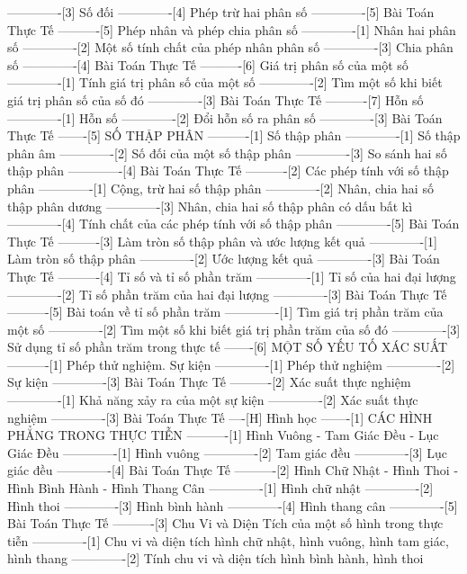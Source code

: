 -------------[3] Số đối
-------------[4] Phép trừ hai phân số
-------------[5] Bài Toán Thực Tế
----------[5] Phép nhân và phép chia phân số
-------------[1] Nhân hai phân số
-------------[2] Một số tính chất của phép nhân phân số
-------------[3] Chia phân số
-------------[4] Bài Toán Thực Tế
----------[6] Giá trị phân số của một số
-------------[1] Tính giá trị phân số của một số
-------------[2] Tìm một số khi biết giá trị phân số của số đó
-------------[3] Bài Toán Thực Tế
----------[7] Hỗn số
-------------[1] Hỗn số
-------------[2] Đổi hỗn số ra phân số
-------------[3] Bài Toán Thực Tế
-------[5] SỐ THẬP PHÂN
----------[1] Số thập phân
-------------[1] Số thập phân âm
-------------[2] Số đối của một số thập phân
-------------[3] So sánh hai số thập phân
-------------[4] Bài Toán Thực Tế
----------[2] Các phép tính với số thập phân
-------------[1] Cộng, trừ hai số thập phân
-------------[2] Nhân, chia hai số thập phân dương
-------------[3] Nhân, chia hai số thập phân có dấu bất kì
-------------[4] Tính chất của các phép tính với số thập phân
-------------[5] Bài Toán Thực Tế
----------[3] Làm tròn số thập phân và ước lượng kết quả
-------------[1] Làm tròn số thập phân
-------------[2] Ước lượng kết quả
-------------[3] Bài Toán Thực Tế
----------[4] Tỉ số và tỉ số phần trăm
-------------[1] Tỉ số của hai đại lượng
-------------[2] Tỉ số phần trăm của hai đại lượng
-------------[3] Bài Toán Thực Tế
----------[5] Bài toán về tỉ số phần trăm
-------------[1] Tìm giá trị phần trăm của một số
-------------[2] Tìm một số khi biết giá trị phần trăm của số đó
-------------[3] Sử dụng tỉ số phần trăm trong thực tế
-------[6] MỘT SỐ YẾU TỐ XÁC SUẤT
----------[1] Phép thử nghiệm. Sự kiện
-------------[1] Phép thử nghiệm
-------------[2] Sự kiện
-------------[3] Bài Toán Thực Tế
----------[2] Xác suất thực nghiệm
-------------[1] Khả năng xảy ra của một sự kiện
-------------[2] Xác suất thực nghiệm
-------------[3] Bài Toán Thực Tế
----[H] Hình học
-------[1] CÁC HÌNH PHẲNG TRONG THỰC TIỄN
----------[1] Hình Vuông - Tam Giác Đều - Lục Giác Đều
-------------[1] Hình vuông
-------------[2] Tam giác đều
-------------[3] Lục giác đều
-------------[4] Bài Toán Thực Tế
----------[2] Hình Chữ Nhật - Hình Thoi - Hình Bình Hành - Hình Thang Cân
-------------[1] Hình chữ nhật
-------------[2] Hình thoi
-------------[3] Hình bình hành
-------------[4] Hình thang cân
-------------[5] Bài Toán Thực Tế
----------[3] Chu Vi và Diện Tích của một số hình trong thực tiễn
-------------[1] Chu vi và diện tích hình chữ nhật, hình vuông, hình tam giác, hình thang
-------------[2] Tính chu vi và diện tích hình bình hành, hình thoi
